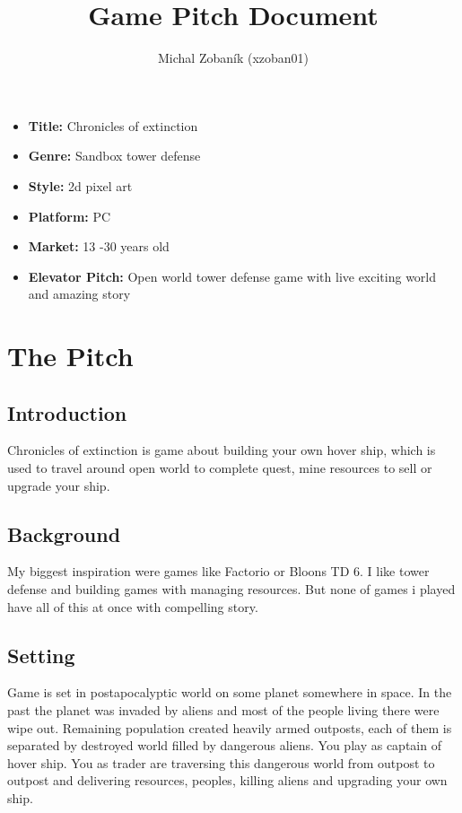 \documentclass[a4paper,10pt,english]{article}
\title{%
Game Pitch Document%
}
\author{%
Michal Zobaník (xzoban01)%
}
\date{}
\begin{document}
\maketitle
\thispagestyle{empty}

{%
\large

\begin{itemize}

\item[] \textbf{Title:} Chronicles of extinction

\item[] \textbf{Genre:} Sandbox tower defense

\item[] \textbf{Style:} 2d pixel art

\item[] \textbf{Platform:} PC

\item[] \textbf{Market:} 13 -30 years old

\item[] \textbf{Elevator Pitch:} Open world tower defense game with live exciting world and amazing story

\end{itemize}

}

\section*{\centering The Pitch}

\subsection*{Introduction}
Chronicles of extinction is game about building your own hover ship, which is used to travel around open world to complete quest, mine resources to sell or upgrade your ship.

\subsection*{Background}
My biggest inspiration were games like Factorio or Bloons TD 6. I like tower defense and building games with managing resources. But none of games i played have all of this at once with compelling story.

\subsection*{Setting}
Game is set in postapocalyptic world on some planet somewhere in space. In the past the planet was invaded by aliens and most of the people living there were wipe out. Remaining population created heavily armed outposts, each of them is separated by destroyed world filled by dangerous aliens. You play as captain of hover ship. You as trader are traversing this dangerous world from outpost to outpost and delivering resources, peoples, killing aliens and upgrading your own ship.
\end{document}
